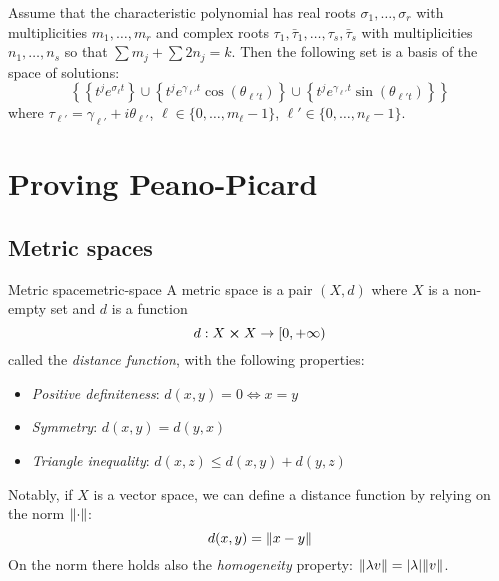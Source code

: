 \documentclass[12pt]{extarticle}
\begin{document}
\begin{theorem}{}{}
    Assume that the characteristic polynomial has real roots $\sigma_1, \dots, \sigma_r$ with multiplicities \newline $m_1,\dots,m_r$ and complex roots $\tau_1, \bar \tau_1, \dots, \tau_s, \bar \tau_s$ with multiplicities $n_1, \dots, n_s$ so that
    $\sum m_j + \sum 2n_j = k$.
    Then the following set is a basis of the space of solutions:
    \begin{equation}
        \left\{ \left\{ t^je^{\sigma_\ell t} \right\} \cup \left\{ t^je^{\gamma_{\ell'} t} \cos(\theta_{\ell' t}) \right\} \cup \left\{ t^je^{\gamma_{\ell'} t} \sin(\theta_{\ell' t}) \right\} \right\}
    \end{equation}
    where $\tau_{\ell'} =\gamma_{\ell'} + i \theta _{\ell'}$, $\ell \in \{0, \dots, m_\ell-1\}$, $\ell' \in \{ 0,\dots, n_\ell -1 \}$.
\end{theorem}


\section{Proving Peano-Picard}

\subsection{Metric spaces}

\begin{definition}{Metric space}{metric-space}
    A metric space is a pair $(X, d)$ where $X$ is a non-empty set and $d$ is a function
    \begin{equation}
        d: X \cross X \to [0, +\infty)
    \end{equation}
    called the \emph{distance function}, with the following properties:
    \begin{itemize}
        \item \emph{Positive definiteness}: $d(x, y) = 0 \iff x = y$
        \item \emph{Symmetry}: $d(x, y) = d(y, x)$
        \item \emph{Triangle inequality}: $d(x, z) \leq d(x, y) + d(y, z)$
    \end{itemize}
\end{definition}

Notably, if $X$ is a vector space, we can define a distance function by relying on the norm $\norm{\cdot}$:
\begin{equation}
    d(x, y) = \norm{x - y}
\end{equation}
On the norm there holds also the \emph{homogeneity} property: $\norm{\lambda v} = \abs{\lambda}\norm{v}$.
\end{document}
